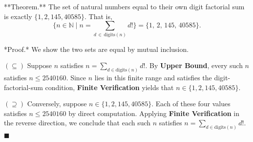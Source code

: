 **Theorem.** The set of natural numbers equal to their own digit factorial sum is exactly $\{1, 2, 145, 40585\}$. That is,
$$\{n \in \mathbb{N} \mid n = \sum_{d \,\in\, \text{digits}(n)} d!\} = \{1,\, 2,\, 145,\, 40585\}.$$

*Proof.* We show the two sets are equal by mutual inclusion.

$(\subseteq)$ Suppose $n$ satisfies $n = \sum_{d \in \text{digits}(n)} d!$. By \textbf{Upper Bound}, every such $n$ satisfies $n \leq 2540160$. Since $n$ lies in this finite range and satisfies the digit-factorial-sum condition, \textbf{Finite Verification} yields that $n \in \{1, 2, 145, 40585\}$.

$(\supseteq)$ Conversely, suppose $n \in \{1, 2, 145, 40585\}$. Each of these four values satisfies $n \leq 2540160$ by direct computation. Applying \textbf{Finite Verification} in the reverse direction, we conclude that each such $n$ satisfies $n = \sum_{d \in \text{digits}(n)} d!$. $\blacksquare$